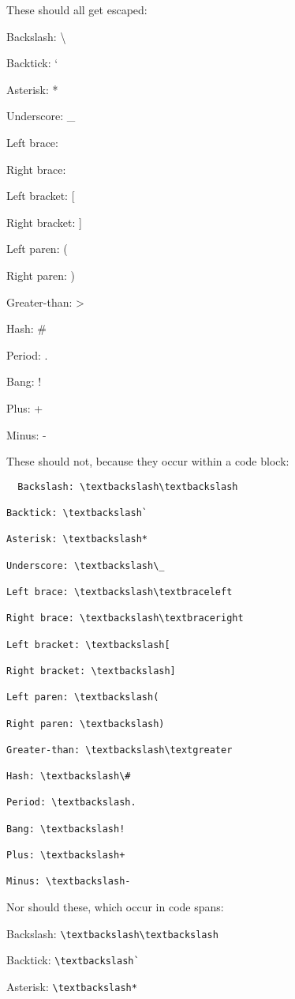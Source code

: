 These should all get escaped:

Backslash: \textbackslash

Backtick: `

Asterisk: *

Underscore: \_

Left brace: \textbraceleft

Right brace: \textbraceright

Left bracket: [

Right bracket: ]

Left paren: (

Right paren: )

Greater-than: \textgreater

Hash: \#

Period: .

Bang: !

Plus: +

Minus: -

These should not, because they occur within a code block:
\begin{verbatim}
  Backslash: \textbackslash\textbackslash

Backtick: \textbackslash`

Asterisk: \textbackslash*

Underscore: \textbackslash\_

Left brace: \textbackslash\textbraceleft

Right brace: \textbackslash\textbraceright

Left bracket: \textbackslash[

Right bracket: \textbackslash]

Left paren: \textbackslash(

Right paren: \textbackslash)

Greater-than: \textbackslash\textgreater

Hash: \textbackslash\#

Period: \textbackslash.

Bang: \textbackslash!

Plus: \textbackslash+

Minus: \textbackslash-
\end{verbatim}

Nor should these, which occur in code spans:

Backslash: \lstinline{\textbackslash\textbackslash}

Backtick: \lstinline{\textbackslash`}

Asterisk: \lstinline{\textbackslash*}

